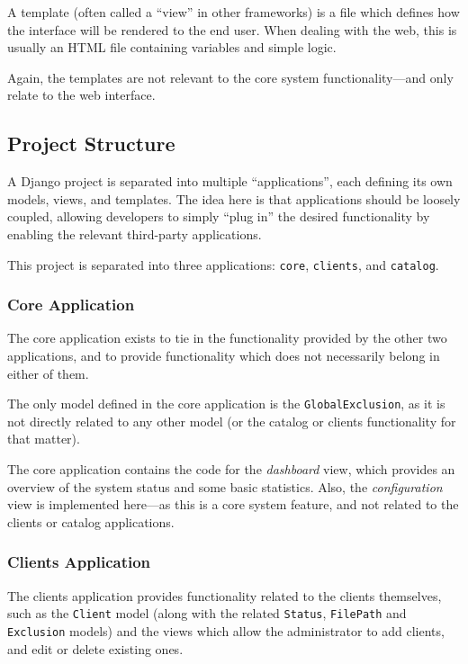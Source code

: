 A template (often called a ``view'' in other frameworks) is a file which
defines how the interface will be rendered to the end user. When dealing with
the web, this is usually an HTML file containing variables and simple logic.

Again, the templates are not relevant to the core system functionality---and
only relate to the web interface.

\subsection{Project Structure}
\label{sec:implementation-django-structure}

A Django project is separated into multiple ``applications'', each defining its
own models, views, and templates. The idea here is that applications should be
loosely coupled, allowing developers to simply ``plug in'' the desired
functionality by enabling the relevant third-party applications.

This project is separated into three applications: \verb!core!, \verb!clients!,
and \verb!catalog!.

\subsubsection{Core Application}
\label{sec:implementation-django-structure-core}

The core application exists to tie in the functionality provided by the other
two applications, and to provide functionality which does not necessarily
belong in either of them.

The only model defined in the core application is the \verb!GlobalExclusion!,
as it is not directly related to any other model (or the catalog or clients
functionality for that matter).

The core application contains the code for the \emph{dashboard} view, which
provides an overview of the system status and some basic statistics. Also, the
\emph{configuration} view is implemented here---as this is a core system
feature, and not related to the clients or catalog applications.

\subsubsection{Clients Application}
\label{sec:implementation-django-structure-clients}

The clients application provides functionality related to the clients
themselves, such as the \verb!Client! model (along with the related
\verb!Status!, \verb!FilePath! and \verb!Exclusion! models) and the views which
allow the administrator to add clients, and edit or delete existing ones.

